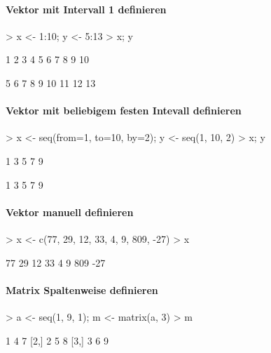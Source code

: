 \paragraph{Vektor mit Intervall 1 definieren}
\begin{Schunk}
\begin{Sinput}
> x <- 1:10; y <- 5:13
> x; y
\end{Sinput}
\begin{Soutput}
 [1]  1  2  3  4  5  6  7  8  9 10
\end{Soutput}
\begin{Soutput}
[1]  5  6  7  8  9 10 11 12 13
\end{Soutput}
\end{Schunk}

\paragraph{Vektor mit beliebigem festen Intevall definieren}
\begin{Schunk}
\begin{Sinput}
> x <- seq(from=1, to=10, by=2); y <- seq(1, 10, 2)
> x; y
\end{Sinput}
\begin{Soutput}
[1] 1 3 5 7 9
\end{Soutput}
\begin{Soutput}
[1] 1 3 5 7 9
\end{Soutput}
\end{Schunk}

\paragraph{Vektor manuell definieren}
\begin{Schunk}
\begin{Sinput}
> x <- c(77, 29, 12, 33, 4, 9, 809, -27)
> x
\end{Sinput}
\begin{Soutput}
[1]  77  29  12  33   4   9 809 -27
\end{Soutput}
\end{Schunk}

\paragraph{Matrix Spaltenweise definieren}
\begin{Schunk}
\begin{Sinput}
> a <- seq(1, 9, 1); m <- matrix(a, 3)
> m
\end{Sinput}
\begin{Soutput}
     [,1] [,2] [,3]
[1,]    1    4    7
[2,]    2    5    8
[3,]    3    6    9
\end{Soutput}
\end{Schunk}

